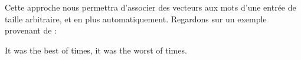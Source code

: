 \documentclass[11pt, a4paper]{report}
\begin{document}
Cette approche nous permettra d'associer des vecteurs aux mots d'une entrée de taille 
arbitraire, et en plus automatiquement. Regardons sur un exemple provenant de \cite{understanding-word-vectors} :
\begin{center}
  It was the best of times, it was the worst of times.                                                                                                                                                                                                                                                                                                                                                                                                                                                                                                                                                                                                                                                                                                                                                                                                                                                                                                                                                                                                                                                                                                                                                                                                                                                                                                                                                                                                                                                                                                                                                                                                                                                                                                                                                                                                                                                                                                                                                                                                                                                                                                                                                                                                                                                                                                                                                                                                                                                                                                                                                                                                                                                                                                                                                                                                                                                                                                                                                                                                                                                                                                                          
\end{center}
\end{document}
